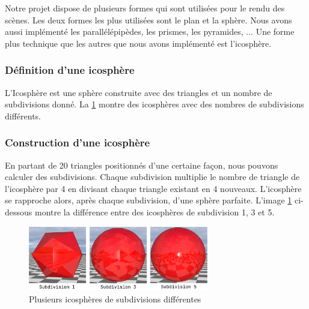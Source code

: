 \documentclass[12pt]{article}
\begin{document}
Notre projet dispose de plusieurs formes qui sont utilisées pour le rendu des scènes. Les deux formes les plus utilisées sont le plan et la sphère. Nous avons aussi implémenté les parallélépipèdes, les prismes, les pyramides, ...
Une forme plus technique que les autres que nous avons implémenté est l'icosphère.
\subsubsection{Définition d'une icosphère}
L'Icosphère est une sphère construite avec des triangles et un nombre de subdivisions donné. La \figurename \ref{fig:image_subdiv} montre des icosphères avec des nombres de subdivisions différents.

\subsubsection{Construction d'une icosphère}
En partant de 20 triangles positionnés d'une certaine façon, nous pouvons calculer des subdivisions.
Chaque subdivision multiplie le nombre de triangle de l'icosphère par 4 en divisant chaque triangle existant en 4 nouveaux.
L'icosphère se rapproche alors, après chaque subdivision, d'une sphère parfaite.
L'image \ref{fig:image_subdiv} ci-dessous montre la différence entre des icosphères de subdivision 1, 3 et 5.

\begin{figure}[ht]
  \begin{center}
    \includegraphics[width=0.7\textwidth]{./img/formes/subdivicosp.png} 
  \caption{Plusieurs icosphères de subdivisions différentes}
  \label{fig:image_subdiv}
\end{center}
\end{figure}
\FloatBarrier
\end{document}
